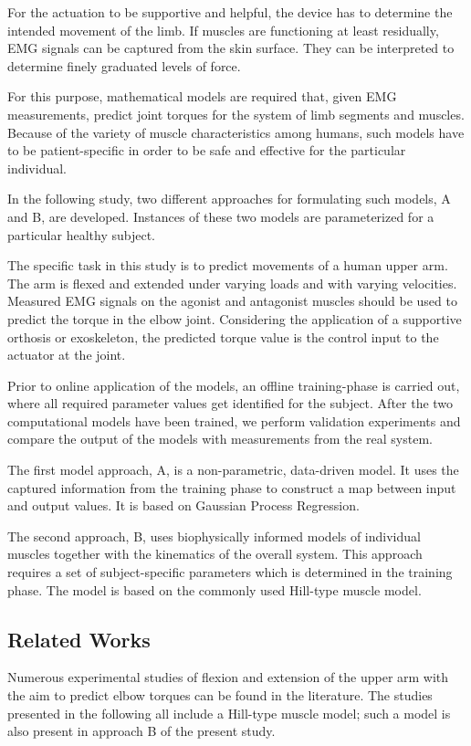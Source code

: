 For the actuation to be supportive and helpful, the device has to determine the intended movement of the limb. If muscles are functioning at least residually, EMG signals can be captured from the skin surface. They can be interpreted to determine finely graduated levels of force.

For this purpose, mathematical models are required that, given EMG measurements, predict joint torques for the system of limb segments and muscles. 
Because of the variety of muscle characteristics among humans, such models have to be patient-specific in order to be safe and effective for the particular individual.

In the following study, two different approaches for formulating such models, A and B, are developed. Instances of these two models are parameterized for a particular healthy subject. 

The specific task in this study is to predict movements of a human upper arm. The arm is flexed and extended under varying loads and with varying velocities. Measured EMG signals on the agonist and antagonist muscles should be used to predict the torque in the elbow joint. Considering the application of a supportive orthosis or exoskeleton, the predicted torque value is the control input to the actuator at the joint.

Prior to online application of the models, an offline training-phase is carried out, where all required parameter values get identified for the subject. After the two computational models have been trained, we perform validation experiments and compare the output of the models with measurements from the real system.
 
The first model approach, A, is a non-parametric, data-driven model. It uses the captured information from the training phase to construct a map between input and output values. It is based on Gaussian Process Regression.

The second approach, B, uses biophysically informed models of individual muscles together with the kinematics of the overall system. This approach requires a set of subject-specific parameters which is determined in the training phase. The model is based on the commonly used Hill-type muscle model.

\subsection{Related Works}

%
Numerous experimental studies of flexion and extension of the upper arm with the aim to predict elbow torques can be found in the literature. The studies presented in the following all include a Hill-type muscle model; such a model is also present in approach B of the present study.


